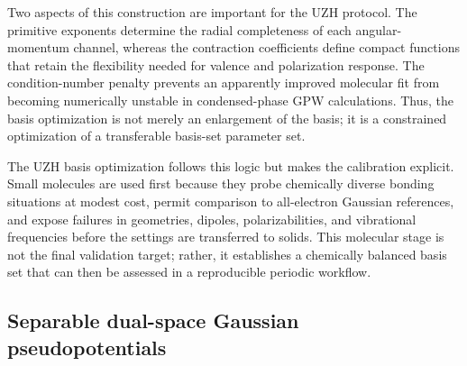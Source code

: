 \documentclass[aps,prb,reprint,amsmath,amssymb,superscriptaddress,longbibliography,floatfix]{revtex4-2}
\begin{document}
Two aspects of this construction are important for the UZH protocol. The primitive exponents determine the radial completeness of each angular-momentum channel, whereas the contraction coefficients define compact functions that retain the flexibility needed for valence and polarization response. The condition-number penalty prevents an apparently improved molecular fit from becoming numerically unstable in condensed-phase GPW calculations. Thus, the basis optimization is not merely an enlargement of the basis; it is a constrained optimization of a transferable basis-set parameter set.

The UZH basis optimization follows this logic but makes the calibration explicit. Small molecules are used first because they probe chemically diverse bonding situations at modest cost, permit comparison to all-electron Gaussian references, and expose failures in geometries, dipoles, polarizabilities, and vibrational frequencies before the settings are transferred to solids. This molecular stage is not the final validation target; rather, it establishes a chemically balanced basis set that can then be assessed in a reproducible periodic workflow.

\subsection{Separable dual-space Gaussian pseudopotentials}
\end{document}
